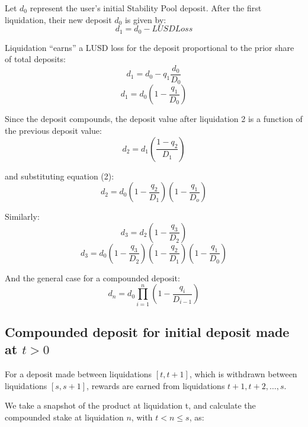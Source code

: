\documentclass[reqno]{article}
\begin{document}
\bigskip
Let $d_0$ represent the user’s initial Stability Pool deposit. After the first liquidation, their new
deposit $d_0$ is given by:\\
\begin{equation} 
    d_1=d_0-LUSDLoss
\end{equation}

\bigskip
Liquidation “earns” a LUSD loss for the deposit proportional to the prior share of total deposits:
\begin{equation} 
    d_1=d_0-q_1\frac{d_0}{D_0}
\end{equation}
\begin{equation} 
    d_1=d_0\left(1-\frac{q_1}{D_0}\right)
\end{equation}

\bigskip
Since the deposit compounds, the deposit value after liquidation 2 is a function of the previous deposit value:
\begin{equation} 
    d_2=d_1\left(\frac{1-q_2}{D_1}\right)
\end{equation}

\bigskip
and substituting equation (2):
\begin{equation} 
    d_2=d_0 \left(1-\frac{q_2}{D_1}\right) \left(1-\frac{q_1}{D_o} \right)
\end{equation}

\bigskip
Similarly:
\begin{equation} 
    d_3=d_2\left(1-\frac{q_3}{D_2}\right)
\end{equation}
\begin{equation} 
    d_3=d_0\left(1-\frac{q_3}{D_2}\right)\left(1-\frac{q_2}{D_1}\right)\left(1-\frac{q_1}{D_0}\right)
\end{equation}

\bigskip
And the general case for a compounded deposit:
\begin{equation} 
    d_n=d_0\prod^n_{i=1}{\left(1-\frac{q_i}{D_{i-1}}\right)}
\end{equation}
\subsection{Compounded deposit for initial deposit made at $t>0$}
For a deposit made between liquidations $[t, t+1]$, which is withdrawn between liquidations $[s, s+1]$, rewards are earned from liquidations $t+1, t+2, \ldots, s$.

We take a snapshot of the product at liquidation t, and calculate the compounded stake at liquidation $n$, with $t < n \leq s$, as:
\end{document}
